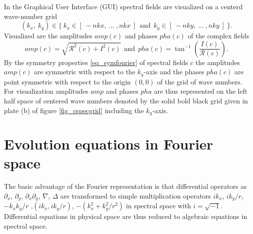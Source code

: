 In the Graphical User Interface (GUI) spectral fields are visualized on
a centerd wave-number grid
\begin{equation} \label{eq_centwgrid}
   (k_{x},\ k_{y}) \in  
   \{\ k_{x} \in [\ -nkx, \ \dots \ ,nkx \ ] 
    \ \ \mbox{and} \ \ 
       k_{y} \in [\ -nky, \ \dots \ ,nky \ ] \ \}.
\end{equation}
Visualized are the amplitudes $amp(c)$ and phases $pha(c)$ of the
complex fields
\begin{equation} \label{eq_amppha}
   amp(c) = \sqrt{\mathcal{R}^{2}(c) + I^{2}(c)}
   \ \ \mbox{and} \ \ 
   pha(c) = \tan^{-1}(\frac{I(c)}{\mathcal{R}(c)}).
\end{equation}
By the symmetry properties \ref{eq_symfourier} of spectral fields $c$
the amplitudes $amp(c)$ are symmetric with respect to the $k_{y}$-axis
and the phases $pha(c)$ are point symmetric with respect to the origin
$(0,0)$ of the grid of wave numbers. For visualization amplitudes $amp$
and phases $pha$ are thus represented on the left half space of centered
wave numbers denoted by the solid bold black grid given in plate (b)
of figure \ref{fig_cspecgrid} including the $k_{y}$-axis.
%
\section{Evolution equations in Fourier space}
%
\label{ssec_evolfourier}
The basic advantage of the Fourier representation is that
differential operators as $\partial_{x}$,
$\partial_{y}$, $\partial_{x} \partial_{y}$, $\nabla$, $\Delta$
are transformed to simple multiplication operators
$i k_{x}$, $i k_{y}/r$, $- k_{x} k_{y}/r$ ,$(i k_{x},i k_{y}/r)$, 
$-(k_{x}^{2} + k_{y}^{2}/r^{2})$ in spectral space with $i = \sqrt{-1}$.
Differential equations in physical space are thus reduced to algebraic 
equations in spectral space.

